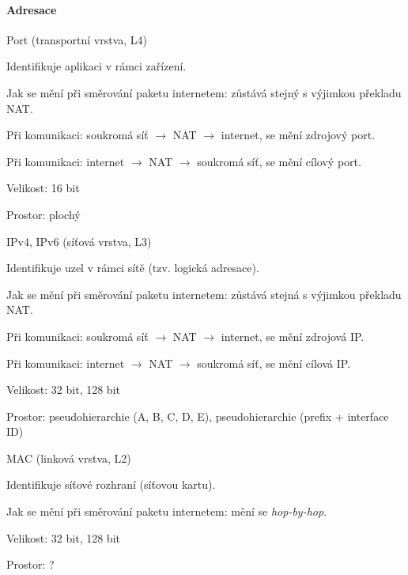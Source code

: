 \paragraph*{Adresace} \begin{compactitem}
    \item Port (transportní vrstva, L4) \begin{compactitem}
        \item Identifikuje aplikaci v rámci zařízení.
        \item Jak se mění při směrování paketu internetem: zůstává stejný s výjimkou překladu NAT. \begin{compactitem}
            \item Při komunikaci: soukromá síť $\rightarrow$ NAT $\rightarrow$ internet, se mění zdrojový port.
            \item Při komunikaci: internet $\rightarrow$ NAT $\rightarrow$ soukromá síť, se mění cílový port.
        \end{compactitem}
        \item Velikost: 16 bit
        \item Prostor: plochý
    \end{compactitem}
    \item IPv4, IPv6 (síťová vrstva, L3) \begin{compactitem}
        \item Identifikuje uzel v rámci sítě (tzv. logická adresace).
        \item Jak se mění při směrování paketu internetem: zůstává stejná s výjimkou překladu NAT. \begin{compactitem}
            \item Při komunikaci: soukromá síť $\rightarrow$ NAT $\rightarrow$ internet, se mění zdrojová IP.
            \item Při komunikaci: internet $\rightarrow$ NAT $\rightarrow$ soukromá síť, se mění cílová IP.
        \end{compactitem}
        \item Velikost: 32 bit, 128 bit
        \item Prostor: pseudohierarchie (A, B, C, D, E), pseudohierarchie (prefix + interface ID)
    \end{compactitem}
    \item MAC (linková vrstva, L2) \begin{compactitem}
        \item Identifikuje síťové rozhraní (síťovou kartu).
        \item Jak se mění při směrování paketu internetem: mění se \textit{hop-by-hop}.
        \item Velikost: 32 bit, 128 bit
        \item Prostor: ?
    \end{compactitem}
\end{compactitem}

